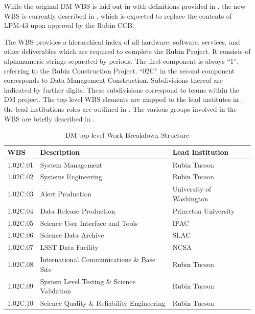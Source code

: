 While the original DM WBS is laid out in  with definitions provided in ,
the new WBS is currently described in , which is expected to replace the contents of LPM-43 upon approval by the Rubin CCB.

The WBS provides a hierarchical index of all hardware, software, services, and other deliverables which are required to complete the Rubin Project.
It consists of alphanumeric strings separated by periods.
The first component is always “1”, referring to the Rubin Construction Project.
``02C'' in the second component corresponds to Data Management Construction.
Subdivisions thereof are indicated by further digits.
These subdivisions correspond to teams within the DM project.
The top level WBS elements are mapped to the lead institutes in ; the lead institutions roles are outlined in .
The various groups involved in the WBS are briefly described in .

\begin{table}
\caption{DM top level Work Breakdown Structure \label{tab:wbs}}
\begin{center}
\begin{tabular}[htb]{|l|l|l|} \hline
\textbf{WBS}  &  \textbf{Description}   &  \textbf{Lead Institution}\\ \hline
1.02C.01& System Management                         &  Rubin Tucson \\ \hline
1.02C.02& Systems Engineering                       &  Rubin Tucson \\ \hline
1.02C.03& Alert Production                          &  University of Washington\\ \hline
1.02C.04& Data Release Production                   &  Princeton University\\ \hline
1.02C.05& Science User Interface and Tools          & IPAC\\ \hline
1.02C.06& Science Data Archive                      & SLAC\\ \hline
1.02C.07& LSST Data Facility                        & NCSA\\ \hline
1.02C.08& International Communications \& Base Site & Rubin Tucson \\ \hline
1.02C.09& System Level Testing \& Science Validation& Rubin Tucson \\ \hline
1.02C.10& Science Quality \& Reliability Engineering& Rubin Tucson \\ \hline
\end{tabular}
\end{center}
\end{table}

